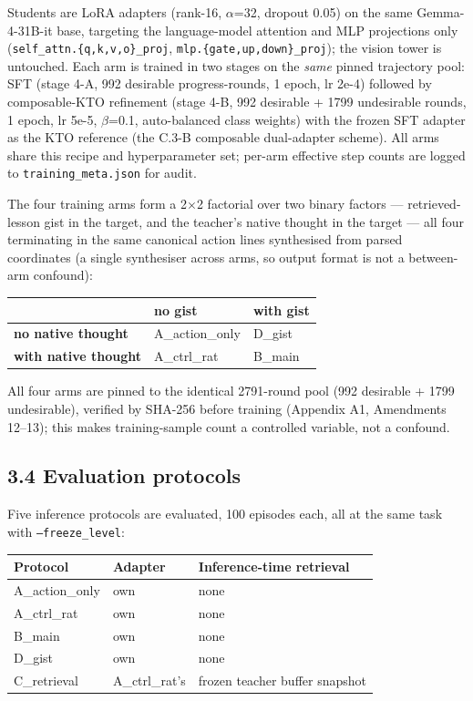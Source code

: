 Students are LoRA adapters (rank-16, $\alpha$=32, dropout 0.05) on the same
Gemma-4-31B-it base, targeting the language-model attention and MLP
projections only (\texttt{self\_attn.\{q,k,v,o\}\_proj}, \texttt{mlp.\{gate,up,down\}\_proj});
the vision tower is untouched. Each arm is trained in two stages on the
\emph{same} pinned trajectory pool: SFT (stage 4-A, 992 desirable
progress-rounds, 1 epoch, lr 2e-4) followed by composable-KTO refinement
(stage 4-B, 992 desirable + 1799 undesirable rounds, 1 epoch, lr 5e-5,
$\beta$=0.1, auto-balanced class weights) with the frozen SFT adapter as the
KTO reference (the C.3-B composable dual-adapter scheme). All arms share
this recipe and hyperparameter set; per-arm effective step counts are
logged to \texttt{training\_meta.json} for audit.

The four training arms form a 2$\times$2 factorial over two binary factors ---
retrieved-lesson gist in the target, and the teacher's native thought
in the target --- all four terminating in the same canonical action lines
synthesised from parsed coordinates (a single synthesiser across arms,
so output format is not a between-arm confound):

\begin{table}[h]
\centering
\begin{tabular}{lll}
\toprule
 & no gist & with gist \\
\midrule
\textbf{no native thought} & A\_action\_only & D\_gist \\
\textbf{with native thought} & A\_ctrl\_rat & B\_main \\
\bottomrule
\end{tabular}
\end{table}

All four arms are pinned to the identical 2791-round pool (992
desirable + 1799 undesirable), verified by SHA-256 before training
(Appendix A1, Amendments 12--13); this makes training-sample count a
controlled variable, not a confound.

\subsection*{3.4 Evaluation protocols}

Five inference protocols are evaluated, 100 episodes each, all at the
same task with \texttt{--freeze\_level}:

\begin{table}[h]
\centering
\begin{tabular}{lll}
\toprule
Protocol & Adapter & Inference-time retrieval \\
\midrule
A\_action\_only & own & none \\
A\_ctrl\_rat & own & none \\
B\_main & own & none \\
D\_gist & own & none \\
C\_retrieval & A\_ctrl\_rat's & frozen teacher buffer snapshot \\
\bottomrule
\end{tabular}
\end{table}

